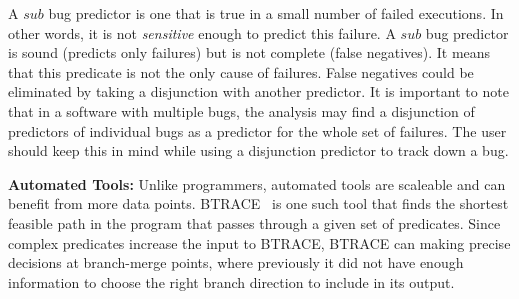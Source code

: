 A $sub$ bug predictor is one that is true in a small number of failed executions.  In other words, it is not {\em sensitive} enough to predict this failure.  A $sub$ bug predictor is sound (predicts only failures) but is not complete (false negatives).  It means that this predicate is not the only cause of failures.  False negatives could be eliminated by taking a disjunction with another predictor.  It is important to note that in a software with multiple bugs, the analysis may find a disjunction of predictors of individual bugs as a predictor for the whole set of failures.  The user should keep this in mind while using a disjunction predictor to track down a bug.

\vspace{4pt} \noindent
{\bf Automated Tools:}  Unlike programmers, automated tools are scaleable and can benefit from more data points.  BTRACE~\cite{Lal:2006:POPAD} is one such tool that finds the shortest feasible path in the program that passes through a given set of predicates.  Since complex predicates increase the input to BTRACE, BTRACE can making precise decisions at branch-merge points, where previously it did not have enough information to choose the right branch direction to include in its output.
